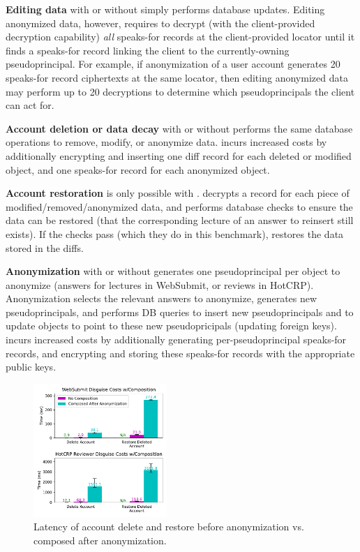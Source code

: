 \textbf{Editing data} with or without \sys simply performs database updates. Editing anonymized
data, however, requires \sys to decrypt (with the client-provided decryption capability) \emph{all}
speaks-for records at the client-provided locator until it finds a speaks-for record linking the
client to the currently-owning pseudoprincipal.  For example, if anonymization of a user account
generates 20 speaks-for record ciphertexts at the same locator, then editing anonymized data may
perform up to 20 decryptions to determine which pseudoprincipals the client can act for.

\textbf{Account deletion or data decay} with or without \sys performs the same database operations
to remove, modify, or anonymize data. \sys incurs increased costs by additionally encrypting and
inserting one diff record for each deleted or modified object, and one speaks-for record for each
anonymized object.

\textbf{Account restoration} is only possible with \sys. \sys decrypts a record for each
piece of modified/removed/anonymized data, and performs database checks to ensure the data can be restored
(\eg that the corresponding lecture of an answer to reinsert still exists). If the checks pass
(which they do in this benchmark), \sys restores the data stored in the diffs.

\textbf{Anonymization} with or without \sys generates one pseudoprincipal per object to anonymize
(\eg answers for lectures in WebSubmit, or reviews in HotCRP). Anonymization selects the relevant answers
to anonymize, generates new pseudoprincipals, and performs DB queries to insert new pseudoprincipals
and to update objects to point to these new pseudopricipals (\eg updating foreign keys).
\sys incurs increased costs by additionally generating per-pseudoprincipal speaks-for records, and
encrypting and storing these speaks-for records with the appropriate public keys.

\begin{figure}[t]
    \centering
    \includegraphics[width=0.45\textwidth]{figs/composition_stats}
    \caption{Latency of account delete and restore before anonymization vs. composed after anonymization.}
    \label{f:composition}
\end{figure}

